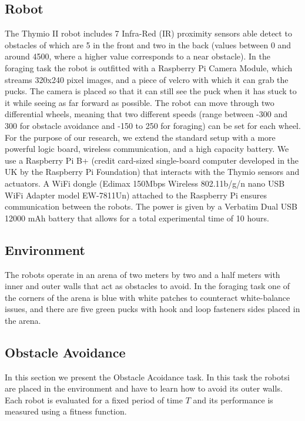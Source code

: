\documentclass{article}
\begin{document}
	\subsection{Robot} %
	\label{sub:Robot}
	The Thymio II robot includes 7 Infra-Red (IR) proximity sensors able detect
	to obstacles of which are 5 in the front and two in the back (values
	between 0 and around 4500, where a higher value corresponds to a near
	obstacle).
	In the foraging task the robot is outfitted with a Raspberry Pi Camera
	Module, which streams 320x240 pixel images, and a piece of velcro with
	which it can grab the pucks. The camera is placed so that it can still see
	the puck when it has stuck to it while seeing as far forward as possible.
	The robot can move through two differential wheels, meaning that two
	different speeds (range between -300 and 300 for obstacle avoidance and
	-150 to 250 for foraging) can be set for each wheel. For the purpose of our
	research, we extend the standard setup with a more powerful logic board,
	wireless communication, and a high capacity battery. We use a Raspberry Pi
	B+ (credit card-sized single-board computer developed in the UK by the
	Raspberry Pi Foundation) that interacts with the Thymio sensors and
	actuators. A WiFi dongle (Edimax 150Mbps Wireless 802.11b/g/n nano USB WiFi
	Adapter model EW-7811Un) attached to the Raspberry Pi ensures communication
	between the robots. The power is given by a Verbatim Dual USB 12000 mAh
	battery that allows for a total experimental time of 10 hours.

	\subsection{Environment} %
	\label{sub:Environment}
	The robots operate in an arena of two meters by two and a half meters with
	inner and outer walls that act as obstacles to avoid.
	In the foraging task one of the corners of the arena is blue with white
	patches to counteract white-balance issues, and there are five green pucks
	with hook and loop fasteners sides placed in the arena.

	\subsection{Obstacle Avoidance} %
	\label{sub:Obstacle Avoidance}
	In this section we present the Obstacle Acoidance task. In this task the
	robotsi are placed in the environment and have to learn how to avoid its
	outer walls. Each robot is evaluated for a fixed period of time $T$ and its
	performance is measured using a fitness function.
\end{document}
